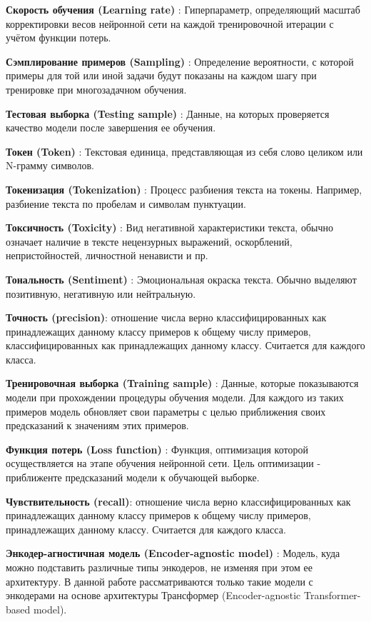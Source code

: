 \textbf{Скорость обучения (Learning rate)} : Гиперпараметр, определяющий масштаб корректировки весов нейронной сети на каждой тренировочной итерации с учётом функции потерь.

\textbf{Сэмплирование примеров (Sampling)} : Определение вероятности, с которой примеры  для той или иной задачи будут показаны на каждом шагу при тренировке при многозадачном обучения. 

\textbf{Тестовая выборка (Testing sample)} : Данные, на которых проверяется качество модели после завершения ее обучения.

\textbf{Токен (Token)} : Текстовая единица, представляющая из себя слово целиком или N-грамму символов.

\textbf{Токенизация (Tokenization)} : Процесс разбиения текста на токены. Например, разбиение текста по пробелам и символам пунктуации.

\textbf{Токсичность (Toxicity)} : Вид негативной характеристики текста, обычно означает наличие в тексте нецензурных выражений, оскорблений, непристойностей, личностной ненависти и пр.

\textbf{Тональность (Sentiment)} : Эмоциональная окраска текста. Обычно выделяют позитивную, негативную или нейтральную.

\textbf{Точность (precision)}: отношение числа верно классифицированных как принадлежащих данному классу примеров к общему числу примеров, классифицированных как принадлежащих данному классу. Считается для каждого класса.

\textbf{Тренировочная выборка (Training sample)} : Данные, которые показываются модели при прохождении процедуры обучения модели. Для каждого из таких примеров модель обновляет свои параметры с целью приближения своих предсказаний к значениям этих примеров.

\textbf{Функция потерь (Loss function)} : Функция, оптимизация которой осуществляется на этапе обучения нейронной сети. Цель оптимизации - приближенте предсказаний модели к обучающей выборке.

\textbf{Чувствительность (recall)}: отношение числа верно классифицированных как принадлежащих данному классу примеров к общему числу примеров, принадлежащих данному классу. Считается для каждого класса.

\textbf{Энкодер-агностичная модель (Encoder-agnostic model)} : Модель, куда можно подставить различные типы энкодеров, не  изменяя при этом ее архитектуру. В данной работе рассматриваются только такие модели с энкодерами на основе архитектуры Трансформер (Encoder-agnostic Transformer-based model).

